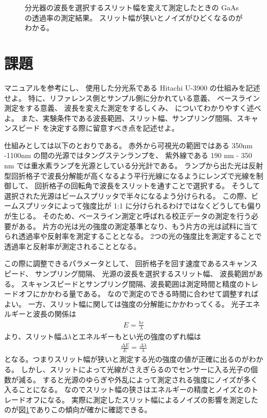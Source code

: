 \documentclass[11pt,dvipdfmx,a4paper]{jsarticle}
\begin{document}
\begin{figure}[H]
\begin{minipage}[t]{0.48\columnwidth}
        \caption{分光器の波長を選択するスリット幅を変えて測定したときの GaAs の透過率の測定結果。
        スリット幅が狭いとノイズがひどくなるのがわかる。}
        \label{graph:06}
    \end{minipage}
\end{figure}

\section{課題}
\begin{tcolorbox}[title = 課題1]
    マニュアルを参考にし、
    使用した分光系である Hitachi U-3900 の仕組みを記述せよ。
    特に、リファレンス側とサンプル側に分かれている意義、
    ベースライン測定をする意義、
    波長を変えた測定をするしくみ、
    についてわかりやすく述べよ。
    また、実験条件である波長範囲、スリット幅、サンプリング間隔、スキャンスピード
    を決定する際に留意すべき点を記述せよ。
\end{tcolorbox}
仕組みとしては以下のとおりである。
赤外から可視光の範囲ではある 350nm -1100nm の間の光源ではタングステンランプを、
紫外線である 190 nm - 350 nm では重水素ランプを光源としている分光計である。
ランプから出た光は反射型回折格子で波長分解能が高くなるよう平行光線になるようにレンズで光線を制御して、
回折格子の回転角で波長をスリットを通すことで選択する。
そうして選択された光源はビームスプリッタで半々になるよう分けられる。
この際、ビームスプリッタによって強度比が 1:1 に分けられるわけではなくどうしても偏りが生じる。
そのため、ベースライン測定と呼ばれる校正データの測定を行う必要がある。
片方の光は光の強度の測定基準となり、もう片方の光は試料に当てられ透過率や反射率を測定することとなる。
2つの光の強度比を測定することで透過率と反射率が測定されることとなる。

この際に調整できるパラメータとして、
回折格子を回す速度であるスキャンスピード、
サンプリング間隔、
光源の波長を選択するスリット幅、
波長範囲がある。
スキャンスピードとサンプリング間隔、波長範囲は測定時間と精度のトレードオフにかかわる量である。
なので測定のできる時間に合わせて調整すればよい。
一方、スリット幅に関しては強度の分解能にかかわってくる。
光子エネルギーと波長の関係は
\begin{align}
    E = \frac{hc}{\lambda}
\end{align}
より、スリット幅\(\Delta\lambda\)とエネルギーもとい光の強度のずれ幅は
\begin{align}
    \frac{\Delta E}{E} = \frac{\Delta\lambda}{\lambda}
\end{align}
となる。つまりスリット幅が狭いと測定する光の強度の値が正確に出るのがわかる。
しかし、スリットによって光線がさえぎらるのでセンサーに入る光子の個数が減る。
すると光源のゆらぎや外乱によって測定される強度にノイズが多く入ることになる。
なのでスリット幅の狭さはエネルギーの精度とノイズとのトレードオフになる。
実際に測定したスリット幅によるノイズの影響を測定したのが図\ref{graph:06}でありこの傾向が確かに確認できる。
\\
\end{document}
